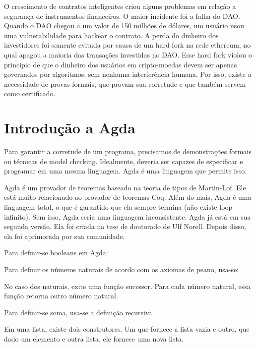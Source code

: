 \documentclass[12pt]{report}
\begin{document}
O crescimento de contratos inteligentes criou alguns problemas em relação a segurança de instrumentos financeiros.
O maior incidente foi a falha do DAO.
Quando o DAO chegou a um valor de 150 milhões de dólares, um usuário usou uma vulnerabilidade para hackear o contrato.
A perda do dinheiro dos investidores foi somente evitada por causa de um hard fork na rede ethereum,
no qual apagou a maioria das transações investidas no DAO.
Esse hard fork violou o principio de que o dinheiro dos usuários em cripto-moedas devem ser apenas governados por algoritmos,
sem nenhuma interferência humana.
Por isso, existe a necessidade de provas formais, que provam sua corretude e que também servem como certificado.

\section{Introdução a Agda}

Para garantir a corretude de um programa, precisamos de demonstrações formais ou técnicas de model checking.
Idealmente, deveria ser capazes de especificar e programar em uma mesma linguagem.
Agda é uma linguagem que permite isso.

Agda é um provador de teoremas baseado na teoria de tipos de Martin-Lof.
Ele está muito relacionado ao provador de teoremas Coq.
Além do mais, Agda é uma linguagem total, o que é garantido que ela sempre termina (não existe loop infinito).
Sem isso, Agda seria uma linguagem inconsistente.
Agda já está em sua segunda versão.
Ela foi criada na tese de doutorado de Ulf Norell.
Depois disso, ela foi aprimorada por sua comunidade.

Para definir-se booleans em Agda:


Para definir os números naturais de acordo com os axiomas de peano, usa-se:


No caso dos naturais, exite uma função sucessor. Para cada número natural, essa função retorna outro número natural.

Para definir-se soma, usa-se a definição recursiva


Em uma lista, existe dois construtores.
Um que fornece a lista vazia e outro, que dado um elemento e outra lista, ele fornece uma nova lista.

\end{document}
